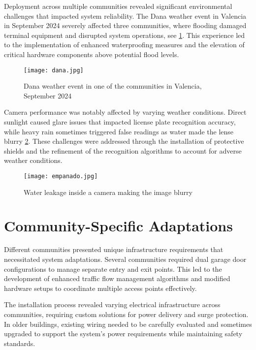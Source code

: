 Deployment across multiple communities revealed significant environmental challenges that impacted system reliability. The Dana weather event in Valencia in September 2024 \autocite{CNNSpainFlooding2024} severely affected three communities, where flooding damaged terminal equipment and disrupted system operations, see \cref{fig:dana}. This experience led to the implementation of enhanced waterproofing measures and the elevation of critical hardware components above potential flood levels. 

\begin{figure}
        \texttt{[image: dana.jpg]}
    \caption{Dana weather event in one of the communities in Valencia, September 2024}\label{fig:dana}
\end{figure}

Camera performance was notably affected by varying weather conditions. Direct sunlight caused glare issues that impacted license plate recognition accuracy, while heavy rain sometimes triggered false readings as water made the lense blurry \cref{fig:wet_camera}. These challenges were addressed through the installation of protective shields and the refinement of the recognition algorithms to account for adverse weather conditions. 

\begin{figure}
        \texttt{[image: empanado.jpg]}
    \caption{Water leakage inside a camera making the image blurry}\label{fig:wet_camera}
\end{figure}

\section{Community-Specific Adaptations}

Different communities presented unique infrastructure requirements that necessitated system adaptations. Several communities required dual garage door configurations to manage separate entry and exit points. This led to the development of enhanced traffic flow management algorithms and modified hardware setups to coordinate multiple access points effectively. 

The installation process revealed varying electrical infrastructure across communities, requiring custom solutions for power delivery and surge protection. In older buildings, existing wiring needed to be carefully evaluated and sometimes upgraded to support the system's power requirements while maintaining safety standards.


